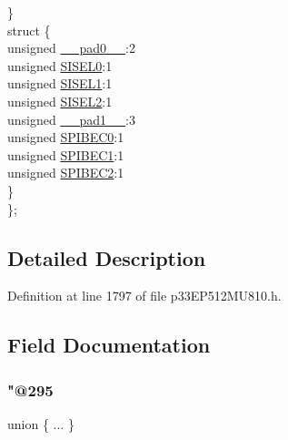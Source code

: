 \begin{DoxyCompactItemize}
\begin{tabbing}
\>\} \\
\>struct \{\\
\>\>unsigned \hyperlink{structtag_s_p_i1_s_t_a_t_b_i_t_s_adf71f3d8410c1f1dbbc96680a92c49af}{\_\_pad0\_\_}:2\\
\>\>unsigned \hyperlink{structtag_s_p_i1_s_t_a_t_b_i_t_s_a718402bd0465fbc4fd6a2a312afc68cc}{SISEL0}:1\\
\>\>unsigned \hyperlink{structtag_s_p_i1_s_t_a_t_b_i_t_s_a70b3f81521b4df5d2bdc98a48ab8a777}{SISEL1}:1\\
\>\>unsigned \hyperlink{structtag_s_p_i1_s_t_a_t_b_i_t_s_a9a7815799509b1ff427025989182aa2a}{SISEL2}:1\\
\>\>unsigned \hyperlink{structtag_s_p_i1_s_t_a_t_b_i_t_s_acaf2d0924a107ec6e8d2e31febaf66f9}{\_\_pad1\_\_}:3\\
\>\>unsigned \hyperlink{structtag_s_p_i1_s_t_a_t_b_i_t_s_aa9b4c159cfcb7a8c3eaf3369b146b3a2}{SPIBEC0}:1\\
\>\>unsigned \hyperlink{structtag_s_p_i1_s_t_a_t_b_i_t_s_ae1c44e4e7fb1aec2d5856ba13ed7851b}{SPIBEC1}:1\\
\>\>unsigned \hyperlink{structtag_s_p_i1_s_t_a_t_b_i_t_s_a995b2cfafb90409d16825fc4d4b23a35}{SPIBEC2}:1\\
\>\} \\
\}; \\

\end{tabbing}\end{DoxyCompactItemize}


\subsection{Detailed Description}


Definition at line 1797 of file p33\+E\+P512\+M\+U810.\+h.



\subsection{Field Documentation}
\mbox{\label{structtag_s_p_i1_s_t_a_t_b_i_t_s_ac460bcdfc64cbceccfaab29d422a35f3}} 
\subsubsection{\texorpdfstring{"@295}{@295}}
{\footnotesize\ttfamily union \{ ... \} }

\mbox{\label{structtag_s_p_i1_s_t_a_t_b_i_t_s_adf71f3d8410c1f1dbbc96680a92c49af}} 
